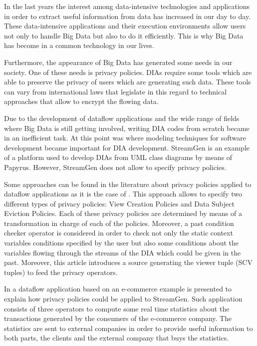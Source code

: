 In the last years the interest among data-intensive technologies and applications in order to extract useful information from data has increased in our day to day. These data-intensive applications and their execution environments allow users not only to handle Big Data but also to do it efficiently. This is why Big Data has become in a common technology in our lives.

Furthermore, the appearance of Big Data has generated some needs in our society. One of these needs is privacy policies. DIAs require some tools which are able to preserve the privacy of users which are generating such data. These tools can vary from international laws that legislate in this regard to technical approaches that allow to encrypt the flowing data.

Due to the development of dataflow applications and the wide range of fields where Big Data is still getting involved, writing DIA codes from scratch became in an inefficient task. At this point was where modeling techniques for software development became important for DIA development. StreamGen is an example of a platform used to develop DIAs from UML class diagrams by means of Papyrus. However, StreamGen does not allow to specify privacy policies.

Some approaches can be found in the literature about privacy policies applied to dataflow applications as it is the case of \cite{privacypoliciesarticle}. This approach allows to specify two different types of privacy policies: View Creation Policies and Data Subject Eviction Policies. Each of these privacy policies are determined by means of a transformation in charge of each of the policies. Moreover, a past condition checker operator is considered in order to check not only the static context variables conditions specified by the user but also some conditions about the variables flowing through the streams of the DIA which could be given in the past. Moreover, this article introduces a source generating the viewer tuple (SCV tuples) to feed the privacy operators.

In \cite{privacypoliciesarticle} a dataflow application based on an e-commerce example is presented to explain how privacy policies could be applied to StreamGen. Such application consists of three operators to compute some real time statistics about the transactions generated by the consumers of the e-commerce company. The statistics are sent to external companies in order to provide useful information to both parts, the clients and the external company that buys the statistics.

